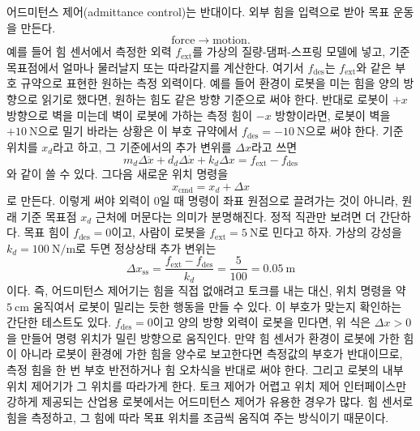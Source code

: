 어드미턴스 제어(admittance control)는 반대이다.
외부 힘을 입력으로 받아 목표 운동을 만든다.
\begin{equation}
  \text{force} \rightarrow \text{motion}.
\end{equation}
예를 들어 힘 센서에서 측정한 외력 $f_{\mathrm{ext}}$를 가상의 질량-댐퍼-스프링 모델에 넣고, 기준 목표점에서 얼마나 물러날지 또는 따라갈지를 계산한다.
여기서 $f_{\mathrm{des}}$는 $f_{\mathrm{ext}}$와 같은 부호 규약으로 표현한 원하는 측정 외력이다.
예를 들어 환경이 로봇을 미는 힘을 양의 방향으로 읽기로 했다면, 원하는 힘도 같은 방향 기준으로 써야 한다.
반대로 로봇이 $+x$ 방향으로 벽을 미는데 벽이 로봇에 가하는 측정 힘이 $-x$ 방향이라면, 로봇이 벽을 $+10~\mathrm{N}$으로 밀기 바라는 상황은 이 부호 규약에서 $f_{\mathrm{des}}=-10~\mathrm{N}$으로 써야 한다.
기준 위치를 $x_d$라고 하고, 그 기준에서의 추가 변위를 $\Delta x$라고 쓰면
\begin{equation}
  m_d\Delta\ddot{x}
  +
  d_d\Delta\dot{x}
  +
  k_d\Delta x
  =
  f_{\mathrm{ext}}-f_{\mathrm{des}}
\end{equation}
와 같이 쓸 수 있다.
그다음 새로운 위치 명령을
\begin{equation}
  x_{\mathrm{cmd}}=x_d+\Delta x
\end{equation}
로 만든다.
이렇게 써야 외력이 0일 때 명령이 좌표 원점으로 끌려가는 것이 아니라, 원래 기준 목표점 $x_d$ 근처에 머문다는 의미가 분명해진다.
정적 직관만 보려면 더 간단하다.
목표 힘이 $f_{\mathrm{des}}=0$이고, 사람이 로봇을 $f_{\mathrm{ext}}=5~\mathrm{N}$로 민다고 하자.
가상의 강성을 $k_d=100~\mathrm{N/m}$로 두면 정상상태 추가 변위는
\begin{equation}
  \Delta x_{\mathrm{ss}}
  =
  \frac{f_{\mathrm{ext}}-f_{\mathrm{des}}}{k_d}
  =
  \frac{5}{100}
  =
  0.05~\mathrm{m}
\end{equation}
이다.
즉, 어드미턴스 제어기는 힘을 직접 없애려고 토크를 내는 대신, 위치 명령을 약 $5~\mathrm{cm}$ 움직여서 로봇이 밀리는 듯한 행동을 만들 수 있다.
이 부호가 맞는지 확인하는 간단한 테스트도 있다.
$f_{\mathrm{des}}=0$이고 양의 방향 외력이 로봇을 민다면, 위 식은 $\Delta x>0$을 만들어 명령 위치가 밀린 방향으로 움직인다.
만약 힘 센서가 환경이 로봇에 가한 힘이 아니라 로봇이 환경에 가한 힘을 양수로 보고한다면 측정값의 부호가 반대이므로, 측정 힘을 한 번 부호 반전하거나 힘 오차식을 반대로 써야 한다.
그리고 로봇의 내부 위치 제어기가 그 위치를 따라가게 한다.
토크 제어가 어렵고 위치 제어 인터페이스만 강하게 제공되는 산업용 로봇에서는 어드미턴스 제어가 유용한 경우가 많다.
힘 센서로 힘을 측정하고, 그 힘에 따라 목표 위치를 조금씩 움직여 주는 방식이기 때문이다.

